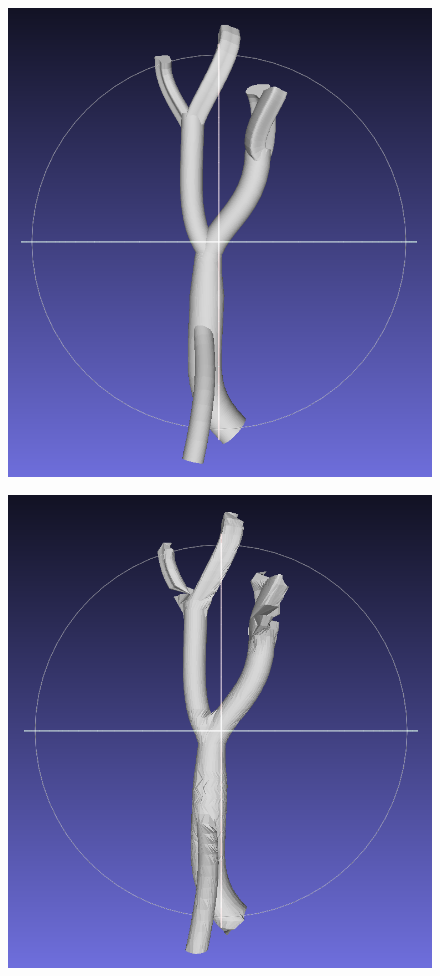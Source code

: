 \documentclass[11p, titlepage]{article}
\newcommand{\reconstructionleft}{0.3}
\newcommand{\reconstructionright}{0.67}
\begin{document}
\begin{figure}[h!]
     \centering
     \begin{minipage}[b]{\reconstructionleft\linewidth}
       {\includegraphics[width=\linewidth]{originals/multi-branch}}%
     \end{minipage}%
     \hfill
     \begin{minipage}[b]{\reconstructionright\linewidth}
       {\includegraphics[width=.48\linewidth]{reconstructions/dtw-multi-branch-50}}%
       \hfill

\end{minipage}
\end{figure}
\end{document}
